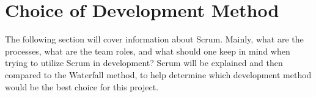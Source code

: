 \section{Choice of Development Method}

The following section will cover information about Scrum. Mainly, what are the 
processes, what are the team roles, and what should one keep in mind when 
trying to utilize Scrum in development? Scrum will be explained and then compared 
to the Waterfall method, to help determine which development method would be the
best choice for this project.




